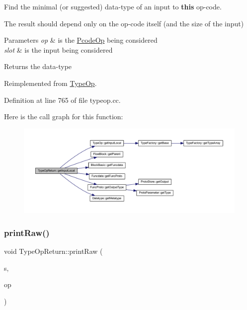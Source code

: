 Find the minimal (or suggested) data-\/type of an input to {\bfseries{this}} op-\/code. 

The result should depend only on the op-\/code itself (and the size of the input) 
\begin{DoxyParams}{Parameters}
{\em op} & is the \mbox{\hyperlink{class_pcode_op}{Pcode\+Op}} being considered \\
\hline
{\em slot} & is the input being considered \\
\hline
\end{DoxyParams}
\begin{DoxyReturn}{Returns}
the data-\/type 
\end{DoxyReturn}


Reimplemented from \mbox{\hyperlink{class_type_op_abe2e4b619932cf94bafb084963a0fc66}{Type\+Op}}.



Definition at line 765 of file typeop.\+cc.

Here is the call graph for this function\+:
\nopagebreak
\begin{figure}[H]
\begin{center}
\leavevmode
\includegraphics[width=350pt]{class_type_op_return_a524940b2f4716701e5d0c62b16c6b001_cgraph}
\end{center}
\end{figure}
\mbox{\label{class_type_op_return_af0becd757dd0479c6f8fe15b6b2ce1fc}} 
\subsubsection{\texorpdfstring{printRaw()}{printRaw()}}
{\footnotesize\ttfamily void Type\+Op\+Return\+::print\+Raw (\begin{DoxyParamCaption}\item[{ostream \&}]{s,  }\item[{const \mbox{\hyperlink{class_pcode_op}{Pcode\+Op}} $\ast$}]{op }\end{DoxyParamCaption})\hspace{0.3cm}{\ttfamily [virtual]}}



